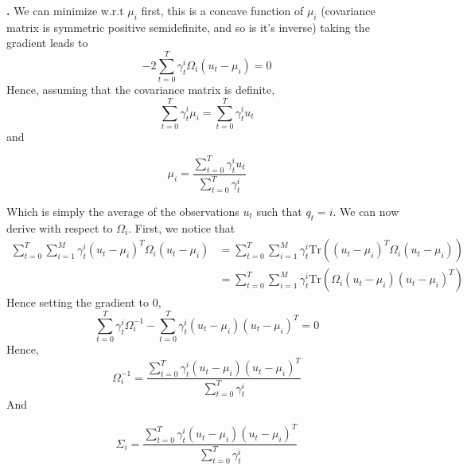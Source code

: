 \documentclass[a4paper, 11pt]{article}
\newcounter{cquestion}[subsection]
\renewcommand{\thecquestion}{\arabic{cquestion}}
\newenvironment{question}
{\par \vspace{0.5em} \noindent \stepcounter{cquestion} \hspace{-1em}
  \textbf{\thecquestion.}}
{}
\newcommand{\tr}[1]{\text{Tr}\left( #1 \right)}
\newcommand{\wrt}{w.r.t }
\begin{document}
\begin{question}
  We can minimize \wrt $\mu_i$ first, this is a concave function of
  $\mu_i$ (covariance matrix is symmetric positive semidefinite, and so
  is it's inverse) taking the gradient leads to
  \begin{displaymath}
    -2 \sum_{t = 0}^{T} \gamma_t^i \Omega_i (u_t - \mu_i) = 0
  \end{displaymath}
  Hence, assuming that the covariance matrix is definite,
  \begin{displaymath}
     \sum_{t = 0}^{T} \gamma_t^i \mu_i = \sum_{t = 0}^{T} \gamma_t^i u_t
  \end{displaymath}
  and
  \begin{framed}
    \begin{displaymath}
      \mu_i = \dfrac{\sum_{t = 0}^{T} \gamma_t^i u_t}{\sum_{t = 0}^{T} \gamma_t^i}
    \end{displaymath}
  \end{framed}
  Which is simply the average of the observations $u_t$ such that $q_t = i$.
  We can now derive with respect to $\Omega_i$. First, we notice that
  \begin{align*}
    \sum_{t=0}^T \sum_{i = 1}^M \gamma_t^i (u_t - \mu_{i})^T \Omega_{i} (u_t - \mu_{i})
    & = \sum_{t=0}^T \sum_{i = 1}^M \gamma_t^i \tr{(u_t - \mu_{i})^T \Omega_{i} (u_t - \mu_{i})} \\
    & = \sum_{t=0}^T \sum_{i = 1}^M \gamma_t^i \tr{\Omega_{i} (u_t - \mu_{i}) (u_t - \mu_{i})^T}
  \end{align*}
  Hence setting the gradient to $0$,
  \begin{displaymath}
    \sum_{t=0}^T \gamma_t^i \Omega_{i}^{-1} - \sum_{t=0}^T \gamma_t^i (u_t - \mu_{i}) (u_t - \mu_{i})^T = 0
  \end{displaymath}
  Hence,
  \begin{displaymath}
    \Omega_{i}^{-1} = \dfrac{\sum_{t=0}^T \gamma_t^i (u_t - \mu_{i}) (u_t - \mu_{i})^T}{\sum_{t=0}^T \gamma_t^i }
  \end{displaymath}
  And
  \begin{framed}
    \begin{displaymath}
      \Sigma_{i} = \dfrac{\sum_{t=0}^T \gamma_t^i (u_t - \mu_{i}) (u_t - \mu_{i})^T}{\sum_{t=0}^T \gamma_t^i }
    \end{displaymath}
  \end{framed}


\end{question}
\end{document}
